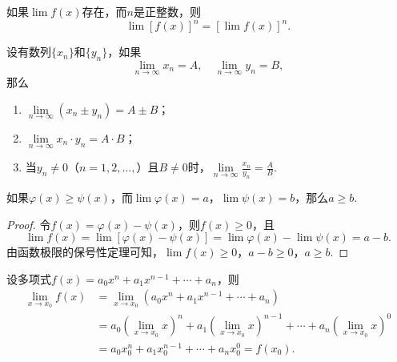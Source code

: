 \begin{corollary}
如果\(\lim f(x)\)存在，而\(n\)是正整数，则\[\lim [f(x)]^n = [\lim f(x)]^n.\]
\end{corollary}

\begin{theorem}
设有数列\(\{x_n\}\)和\(\{y_n\}\)，如果\[
\lim\limits_{n\to\infty}x_n = A,
\quad
\lim\limits_{n\to\infty}y_n = B,
\]那么\begin{enumerate}
\item \(\lim\limits_{n\to\infty}{(x_n \pm y_n)}=A \pm B\)；
\item \(\lim\limits_{n\to\infty}{x_n \cdot y_n}=A \cdot B\)；
\item 当\(y_n \neq 0\)（\(n=1,2,\dotsc,\)）且\(B \neq 0\)时，\(\lim\limits_{n\to\infty}{\frac{x_n}{y_n}}=\frac{A}{B}\).
\end{enumerate}
\end{theorem}

\begin{theorem}
如果\(\varphi(x) \geqslant \psi(x)\)，而\(\lim \varphi(x)=a\)，\(\lim \psi(x)=b\)，那么\(a \geqslant b\).
\begin{proof}
令\(f(x) = \varphi(x) - \psi(x)\)，则\(f(x) \geqslant 0\)，且\[
\lim f(x) = \lim[\varphi(x) - \psi(x)]
= \lim \varphi(x) - \lim \psi(x)
= a - b.
\]由函数极限的保号性定理可知，\(\lim f(x) \geqslant 0\)，\(a - b \geqslant 0\)，\(a \geqslant b\).
\end{proof}
\end{theorem}

\begin{example}
设多项式\(f(x) = a_0 x^n + a_1 x^{n-1} + \dotsb + a_n\)，则\begin{align*}
\lim\limits_{x \to x_0}f(x) &= \lim\limits_{x \to x_0}{(a_0 x^n + a_1 x^{n-1} + \dotsb + a_n)} \\
&= a_0 (\lim\limits_{x \to x_0} x)^n + a_1 (\lim\limits_{x \to x_0} x)^{n-1} + \dotsb + a_n (\lim\limits_{x \to x_0} x)^0 \\
&= a_0 x_0^n + a_1 x_0^{n-1} + \dotsb + a_n x_0^0
= f(x_0).
\end{align*}
\end{example}

